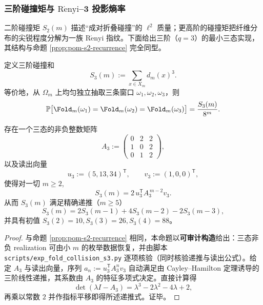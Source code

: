 \subsubsection{三阶碰撞矩与 \texorpdfstring{$\mathrm{R\acute{e}nyi}$}{Renyi}--3 投影熵率}\label{subsec:pom-s3}
二阶碰撞矩 \(S_2(m)\) 描述“成对折叠碰撞”的 \(\ell^2\) 质量；更高阶的碰撞矩把纤维分布的尖锐程度分解为一族 \(\mathrm{R\acute{e}nyi}\) 指纹。下面给出三阶（\(q=3\)）的最小三态实现，其结构与命题 \ref{prop:pom-s2-recurrence} 完全同型。

\begin{definition}[三阶折叠碰撞矩]\label{def:pom-s3}
定义三阶碰撞和
$$
S_3(m):=\sum_{x\in X_m} d_m(x)^3.
$$
等价地，从 \(\Omega_m\) 上均匀独立抽取三条窗口 \(\omega_1,\omega_2,\omega_3\)，则
$$
\mathbb{P}\bigl[\Fold_m(\omega_1)=\Fold_m(\omega_2)=\Fold_m(\omega_3)\bigr]=\frac{S_3(m)}{8^m}.
$$
\end{definition}

\begin{proposition}[三阶碰撞核的三态表示与三阶递推]\label{prop:pom-s3-recurrence}
存在一个三态的非负整数矩阵
$$
A_3:=
\begin{pmatrix}
0&2&2\\
1&0&2\\
0&1&2
\end{pmatrix},
$$
以及读出向量
$$
u_3:=(5,13,34)^{\mathsf T},\qquad v_3:=(1,0,0)^{\mathsf T},
$$
使得对一切 \(m\ge 2\),
$$
S_3(m)=2\,u_3^{\mathsf T}A_3^{\,m-2}v_3.
$$
从而 \(S_3(m)\) 满足精确递推（\(m\ge 5\)）
$$
S_3(m)=2S_3(m-1)+4S_3(m-2)-2S_3(m-3),
$$
并具有初值 \(S_3(2)=10,S_3(3)=26,S_3(4)=88\)。
\end{proposition}
\begin{proof}
与命题 \ref{prop:pom-s2-recurrence} 相同，本命题以\textbf{可审计构造}给出：三态非负 realization 可由小 \(m\) 的枚举数据恢复，并由脚本 \texttt{scripts/exp\_fold\_collision\_s3.py} 逐项核验（同时核验递推与读出公式）。给定 \(A_3\) 与读出向量，序列
\(
a_n:=u_3^{\mathsf T}A_3^{n}v_3
\)
自动满足由 Cayley--Hamilton 定理诱导的三阶线性递推，其系数由 \(A_3\) 的特征多项式决定。直接计算得
$$
\det(\lambda I-A_3)=\lambda^3-2\lambda^2-4\lambda+2,
$$
再乘以常数 \(2\) 并作指标平移即得所述递推式。证毕。
\end{proof}

